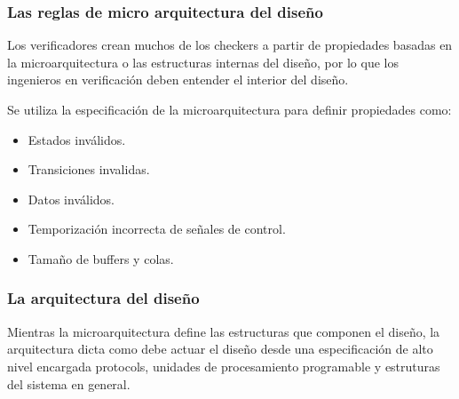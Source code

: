 \subsubsection{Las reglas de micro arquitectura del diseño} 

Los verificadores crean muchos de los checkers a partir de propiedades basadas en la microarquitectura o las estructuras internas del diseño, por lo que los ingenieros en verificación deben entender el interior del diseño.  

Se utiliza la especificación de la microarquitectura para definir propiedades como:
\begin{itemize}
\item Estados inválidos.
\item Transiciones invalidas.
\item Datos inválidos.
\item Temporización incorrecta de señales de control.
\item Tamaño de buffers y colas.
\end{itemize}

\subsubsection{La arquitectura del diseño} 
Mientras la microarquitectura define las estructuras que componen el diseño, la arquitectura dicta como debe actuar el diseño desde una especificación de alto nivel encargada protocols, unidades de procesamiento programable y estruturas del sistema en general.